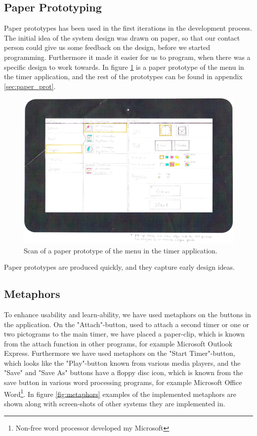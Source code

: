 \subsection*{Paper Prototyping}
Paper prototypes\cite{misc:designInterSys} has been used in the first iterations in the development process. The initial idea of the system design was drawn on paper, so that our contact person could give us some feedback on the design, before we started programming. Furthermore it made it easier for us to program, when there was a specific design to work towards. In figure \ref{fig:pap_prot_menu} is a paper prototype of the menu in the timer application, and the rest of the prototypes can be found in appendix \ref{sec:paper_prot}.

\begin{figure}[H]
	\centering
		\includegraphics[width=\textwidth]{Images/paper_prototype/menu.png}
			\caption{Scan of a paper prototype of the menu in the timer application.}
	\label{fig:pap_prot_menu}
\end{figure}

Paper prototypes are produced quickly, and they capture early design ideas.

\subsection{Metaphors}
To enhance usability and learn-ability, we have used metaphors\cite{misc:designInterSys} on the buttons in the application. On the "Attach"-button, used to attach a second timer or one or two pictograms to the main timer, we have placed a paper-clip, which is known from the attach function in other programs, for example Microsoft Outlook Express. Furthermore we have used metaphors on the "Start Timer"-button, which looks like the "Play"-button known from various media players, and the "Save" and "Save As" buttons have a floppy disc icon, which is known from the save button in various word processing programs, for example Microsoft Office Word\footnote{Non-free word processor developed my Microsoft}. In figure \ref{fig:metaphors} examples of the implemented metaphors are shown along with screen-shots of other systems they are implemented in.

